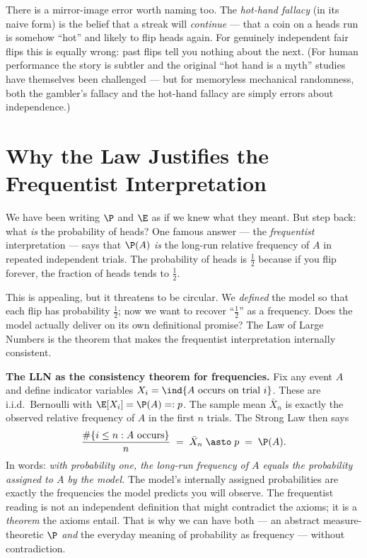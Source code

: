 There is a mirror-image error worth naming too. The \emph{hot-hand fallacy} (in its naive form) is the belief that a streak will \emph{continue} --- that a coin on a heads run is somehow ``hot'' and likely to flip heads again. For genuinely independent fair flips this is equally wrong: past flips tell you nothing about the next. (For human performance the story is subtler and the original ``hot hand is a myth'' studies have themselves been challenged --- but for memoryless mechanical randomness, both the gambler's fallacy and the hot-hand fallacy are simply errors about independence.)

\section{Why the Law Justifies the Frequentist Interpretation}
\label{ch20:frequentist}

We have been writing $\P$ and $\E$ as if we knew what they meant. But step back: what \emph{is} the probability of heads? One famous answer --- the \emph{frequentist} interpretation --- says that $\P(A)$ \emph{is} the long-run relative frequency of $A$ in repeated independent trials. The probability of heads is $\tfrac12$ because if you flip forever, the fraction of heads tends to $\tfrac12$.

This is appealing, but it threatens to be circular. We \emph{defined} the model so that each flip has probability $\tfrac12$; now we want to recover ``$\tfrac12$'' as a frequency. Does the model actually deliver on its own definitional promise? The Law of Large Numbers is the theorem that makes the frequentist interpretation internally consistent.

\begin{whybox}
\textbf{The LLN as the consistency theorem for frequencies.} Fix any event $A$ and define indicator variables $X_i = \ind\{A \text{ occurs on trial } i\}$. These are i.i.d.\ Bernoulli with $\E[X_i] = \P(A) =: p$. The sample mean $\bar X_n$ is exactly the observed relative frequency of $A$ in the first $n$ trials. The Strong Law then says
\[
  \frac{\#\{i \le n : A \text{ occurs}\}}{n} \;=\; \bar X_n \;\asto\; p \;=\; \P(A).
\]
In words: \emph{with probability one, the long-run frequency of $A$ equals the probability assigned to $A$ by the model.} The model's internally assigned probabilities are exactly the frequencies the model predicts you will observe. The frequentist reading is not an independent definition that might contradict the axioms; it is a \emph{theorem} the axioms entail. That is why we can have both --- an abstract measure-theoretic $\P$ \emph{and} the everyday meaning of probability as frequency --- without contradiction.
\end{whybox}

